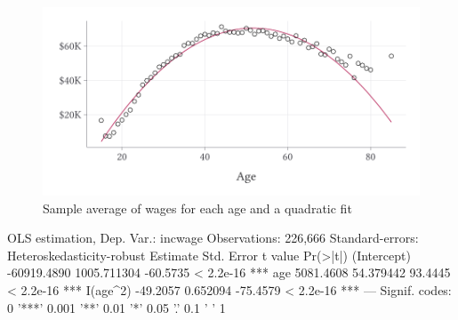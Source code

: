 \documentclass[12pt]{article}
\begin{document}
\begin{enumerate}
  \begin{figure}
    \caption{Sample average of wages for each age and a quadratic fit}
    \label{fig:wage_vs_age}
    \includegraphics[width = \linewidth]{figures/plot_wage_age.pdf}
  \end{figure}

  \bigskip
  \begin{codeblock}[{}]
OLS estimation, Dep. Var.: incwage
Observations: 226,666
Standard-errors: Heteroskedasticity-robust
                Estimate  Std. Error  t value  Pr(>|t|)
(Intercept) -60919.4890 1005.711304 -60.5735 < 2.2e-16 ***
age           5081.4608   54.379442  93.4445 < 2.2e-16 ***
I(age^2)       -49.2057    0.652094 -75.4579 < 2.2e-16 ***
---
Signif. codes:  0 '***' 0.001 '**' 0.01 '*' 0.05 '.' 0.1 ' ' 1
  \end{codeblock}


\end{enumerate}
\end{document}
